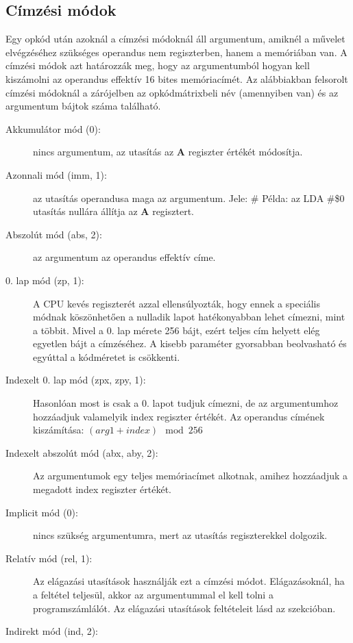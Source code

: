 \subsection{Címzési módok}

Egy opkód után azoknál a címzési módoknál áll argumentum, amiknél a művelet elvégzéséhez 
szükséges operandus nem regiszterben, hanem a memóriában van. A címzési módok azt határozzák meg, hogy az argumentumból hogyan kell kiszámolni az operandus effektív 16 bites memóriacímét. Az alábbiakban felsorolt  címzési módoknál a zárójelben az opkódmátrixbeli név (amennyiben van) és az argumentum bájtok száma található.  


\begin{description}
	\item[Akkumulátor mód (0):] nincs argumentum, az utasítás az \textbf{A} regiszter értékét módosítja.
	\item[Azonnali mód (imm, 1):] az utasítás operandusa maga az argumentum. Jele: \#
	\newline
	Példa: az LDA \#\$0 utasítás nullára állítja az \textbf{A} regisztert.
	\item[Abszolút mód (abs, 2):] az argumentum az operandus effektív címe.
	\item[0. lap mód (zp, 1):] A CPU kevés regiszterét azzal ellensúlyozták, hogy ennek a speciális módnak köszönhetően a nulladik lapot hatékonyabban lehet címezni, mint a többit. 
	Mivel a 0. lap mérete 256 bájt, ezért teljes cím helyett elég egyetlen bájt a címzéséhez.
	A kisebb paraméter gyorsabban beolvasható és egyúttal a kódméretet is csökkenti.
	\item[Indexelt 0. lap mód (zpx, zpy, 1):]
	Hasonlóan most is csak a 0. lapot tudjuk címezni, de az argumentumhoz hozzáadjuk valamelyik index regiszter értékét.
	Az operandus címének kiszámítása: $ (arg1 + index) \mod 256 $
	\item[Indexelt abszolút mód (abx, aby, 2):] Az argumentumok egy teljes memóriacímet alkotnak, amihez hozzáadjuk a megadott index regiszter értékét. 
	\item[Implicit mód (0):] nincs szükség argumentumra, mert az utasítás regiszterekkel dolgozik.
	\item[Relatív mód (rel, 1):] Az elágazási utasítások használják ezt a címzési módot. Elágazásoknál, ha a feltétel teljesül, akkor az argumentummal el kell tolni a programszámlálót. Az elágazási utasítások feltételeit lásd az \emph{} szekcióban.
	\item[Indirekt mód (ind, 2):] 

\end{description}

